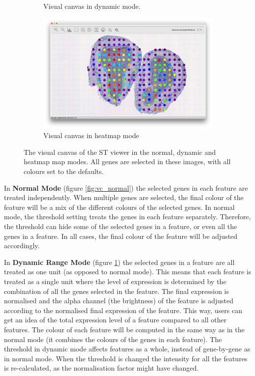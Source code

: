 \documentclass[10pt,a4paper,titlepage]{book}
\begin{document}
\begin{figure}[h]
\begin{subfigure}{0.3\linewidth}
		\caption{Visual canvas in dynamic mode.}
		\label{fig:vc_dynamic}
	\end{subfigure}
	\begin{subfigure}{0.3\linewidth}
		\includegraphics[width=\linewidth]{./Pictures/vc_heatmap}
		\caption{Visual canvas in heatmap mode}
		\label{fig:vc_heatmap}
	\end{subfigure}
	\caption[The visual canvas of the ST viewer in each map mode.]{The visual canvas of the ST viewer in the normal, dynamic and heatmap map modes. All genes are selected in these images, with all colours set to the defaults.}
\end{figure}

In \textbf{Normal Mode} (figure \ref{fig:vc_normal}) the selected genes in each feature are treated independently. When multiple genes are selected, the final colour of the feature will be a mix of the different colours of the selected genes. In normal mode, the threshold setting treats the genes in each feature separately. Therefore, the threshold can hide some of the selected genes in a feature, or even all the genes in a feature. In all cases, the final colour of the feature will be adjusted accordingly.

In \textbf{Dynamic Range Mode} (figure \ref{fig:vc_dynamic}) the selected genes in a feature are all treated as one unit (as opposed to normal mode). This means that each feature is treated as a single unit where the level of expression is determined by the combination of all the genes selected in the feature. The final expression is normalised and the alpha channel (the brightness) of the feature is adjusted according  to the normalised final expression of the feature. This way, users can get an idea of the total expression level of a feature compared to all other features. The colour of each feature will be computed in the same way as in the normal mode (it combines the colours of the genes in each feature).
The threshold in dynamic mode affects features as a whole, instead of gene-by-gene as in normal mode. When the threshold is changed the intensity for all the features is re-calculated, as the normalisation factor might have changed.
\end{document}
